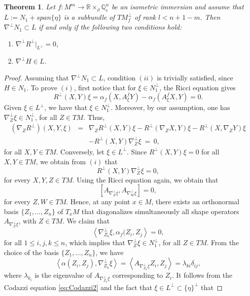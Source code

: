 \documentclass[11pt,a4paper]{article}
\newtheorem{teo}[defi]{Theorem}
\numberwithin{equation}{section}
\newcommand{\R}{\mathbb{R}}
\newcommand{\Q}{\mathbb{Q}}
\newcommand{\WP}{\R\times_{\rho}\Q^n_{\epsilon}}
\newcommand{\co}{\colon}
\begin{document}
\begin{teo} \label{teo:redCodim}
Let $f\co M^m\to\WP$ be an isometric immersion and assume that $L:= N_{1}+span\{\eta\}$ is a subbundle of $TM^\perp_f$ of rank $l<n+1-m$. Then $\nabla^{\perp}N_1 \subset L$ if and only if the following two conditions hold:
\begin{enumerate}
\item[(i)] $\nabla^{\perp}R^{\perp}\vert_{L^{\perp}}=0$,
\item[(ii)] $\nabla^{\perp}H \in L$.
\end{enumerate}
\end{teo}
\begin{proof}
Assuming that $\nabla^{\perp}N_1\subset L$, condition $(ii)$ is trivially satisfied, since $H\in N_1$. To prove $(i)$, first notice that for $\xi\in N_{1}^\perp$, the Ricci equation gives
\[
R^\perp(X,Y)\xi = \alpha_f(X,A^f_\xi Y) - \alpha_f(A^f_\xi X,Y)=0.
\]
Given $\xi\in L^\perp$, we have that $\xi\in N_1^\perp$. Moreover, by our assumption, one has $\nabla_Z^\perp\xi\in N_{ 1}^{\perp}$, for all $Z\in TM$. Thus, 
\begin{eqnarray*} 
(\nabla_{Z}R^{\perp})(X,Y,\xi) & = & \nabla_ZR^\perp(X,Y)\xi- R^{\perp}( \nabla_{Z}X,Y)\xi - R^{\perp}(X,\nabla_{Z}Y)\xi \\ 
&& -  R^{\perp}(X,Y)\nabla_{Z}^{\perp}\xi \ = \ 0,
\end{eqnarray*}
for all $X,Y\in TM$. Conversely, let $\xi\in L^\perp$. Since $R^{\perp}(X,Y)\xi=0$ for all $X,Y \in TM$, we obtain from $(i)$ that
\[
R^{\perp}(X,Y)\nabla_{Z}^{\perp}\xi=0,
\]
for every $X,Y,Z \in TM$. Using the Ricci equation again, we obtain that
\[
\left[A_{\nabla_{Z}^{\perp}\xi},A_{\nabla_{W}^{\perp}\xi}\right]=0,
\]
for every $Z,W \in TM$. Hence, at any point $x\in M$, there exists an orthonormal basis $\{Z_1,\ldots,Z_n\}$ of $T_x M$ that diagonalizes simultaneously all shape operators $A_{\nabla_{Z}^{\perp}\xi}$, with $Z\in TM$. We claim that
\[
\left\langle \nabla_{Z_{k}}^{\perp}\xi,\alpha_f(Z_{i},Z_{j}\right\rangle=0,
\]
for all $1\leq i,j,k \leq n$, which implies that $\nabla_Z^{\perp}\xi\in N_{1}^{\perp}$, for all $Z\in TM$. From the choice of the basis $\{Z_1,\ldots,Z_n\}$, we have
\[
\left\langle\alpha (Z_i,Z_j ), \nabla_{Z_{k}}^{\perp}\xi\right\rangle = \left\langle A_{\nabla_{Z_{k}}^{\perp}\xi} Z_i, Z_j\right\rangle = \lambda_{ki}\delta_{ij},
\]
where $\lambda_{k_i}$ is the eigenvalue of $A_{\nabla_{Z_{k}}^{\perp}\xi}$ corresponding to $Z_i$. It follows from the Codazzi equation \eqref{eq:Codazzi2} and the fact that $\xi\in L^{\perp}\subset \{\eta\}^{\perp}$ that

\end{proof}
\end{document}
